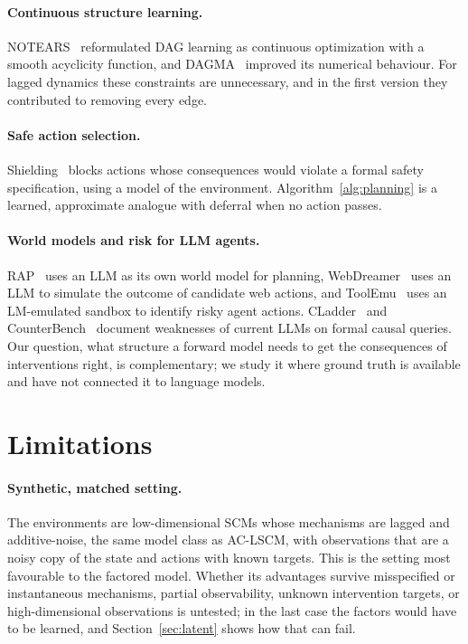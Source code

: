 \paragraph{Continuous structure learning.}
NOTEARS~\citep{zheng2018notears} reformulated DAG learning as continuous
optimization with a smooth acyclicity function, and DAGMA~\citep{bello2022dagma}
improved its numerical behaviour. For lagged dynamics these constraints are
unnecessary, and in the first version they contributed to removing every edge.

\paragraph{Safe action selection.}
Shielding~\citep{alshiekh2018shielding} blocks actions whose consequences
would violate a formal safety specification, using a model of the
environment. Algorithm~\ref{alg:planning} is a learned, approximate analogue
with deferral when no action passes.

\paragraph{World models and risk for LLM agents.}
RAP~\citep{hao2023rap} uses an LLM as its own world model for planning,
WebDreamer~\citep{gu2024webdreamer} uses an LLM to simulate the outcome of
candidate web actions, and ToolEmu~\citep{ruan2024toolemu} uses an LM-emulated
sandbox to identify risky agent actions. CLadder~\citep{jin2023cladder} and
CounterBench~\citep{chen2025counterbench} document weaknesses of current LLMs
on formal causal queries. Our question, what structure a forward model needs
to get the consequences of interventions right, is complementary; we study it
where ground truth is available and have not connected it to language
models.

\section{Limitations}
\label{sec:limitations}

\paragraph{Synthetic, matched setting.}
The environments are low-dimensional SCMs whose mechanisms are lagged and
additive-noise, the same model class as AC-LSCM, with observations that are a
noisy copy of the state and actions with known targets. This is the setting
most favourable to the factored model. Whether its advantages survive
misspecified or instantaneous mechanisms, partial observability, unknown
intervention targets, or high-dimensional observations is untested; in the
last case the factors would have to be learned, and Section~\ref{sec:latent}
shows how that can fail.

